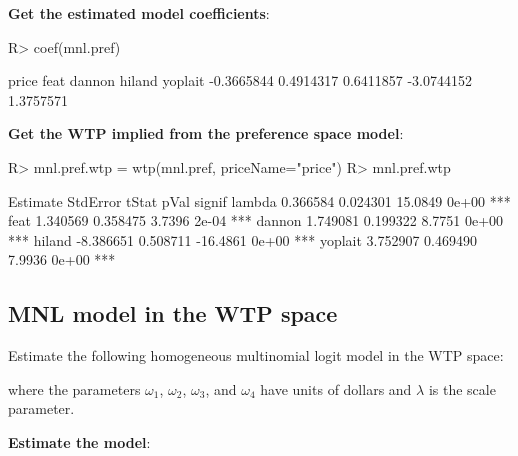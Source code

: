 \documentclass[article]{jss}
\begin{document}
\textbf{Get the estimated model coefficients}:

\begin{CodeChunk}

\begin{CodeInput}
R> coef(mnl.pref)
\end{CodeInput}

\begin{CodeOutput}
     price       feat     dannon     hiland    yoplait 
-0.3665844  0.4914317  0.6411857 -3.0744152  1.3757571 
\end{CodeOutput}
\end{CodeChunk}

\textbf{Get the WTP implied from the preference space model}:

\begin{CodeChunk}

\begin{CodeInput}
R> mnl.pref.wtp = wtp(mnl.pref, priceName="price")
R> mnl.pref.wtp
\end{CodeInput}

\begin{CodeOutput}
         Estimate StdError    tStat  pVal signif
lambda   0.366584 0.024301  15.0849 0e+00    ***
feat     1.340569 0.358475   3.7396 2e-04    ***
dannon   1.749081 0.199322   8.7751 0e+00    ***
hiland  -8.386651 0.508711 -16.4861 0e+00    ***
yoplait  3.752907 0.469490   7.9936 0e+00    ***
\end{CodeOutput}
\end{CodeChunk}

\newpage

\hypertarget{mnl-model-in-the-wtp-space}{%
\subsection{MNL model in the WTP
space}\label{mnl-model-in-the-wtp-space}}

Estimate the following homogeneous multinomial logit model in the WTP
space:



where the parameters \(\omega_1\), \(\omega_2\), \(\omega_3\), and
\(\omega_4\) have units of dollars and \(\lambda\) is the scale
parameter.

\textbf{Estimate the model}:
\end{document}
